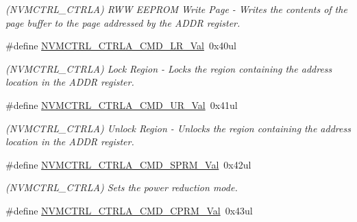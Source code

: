 \begin{DoxyCompactItemize}
\begin{DoxyCompactList}\small\item\em (N\+V\+M\+C\+T\+R\+L\+\_\+\+C\+T\+R\+L\+A) R\+W\+W E\+E\+P\+R\+O\+M Write Page -\/ Writes the contents of the page buffer to the page addressed by the A\+D\+D\+R register. \end{DoxyCompactList}\item 
\hypertarget{group___s_a_m_l21___n_v_m_c_t_r_l_ga30ddc4581bb1d3ba0a5dfebff3025ae6}{}\#define \hyperlink{group___s_a_m_l21___n_v_m_c_t_r_l_ga30ddc4581bb1d3ba0a5dfebff3025ae6}{N\+V\+M\+C\+T\+R\+L\+\_\+\+C\+T\+R\+L\+A\+\_\+\+C\+M\+D\+\_\+\+L\+R\+\_\+\+Val}~0x40ul\label{group___s_a_m_l21___n_v_m_c_t_r_l_ga30ddc4581bb1d3ba0a5dfebff3025ae6}

\begin{DoxyCompactList}\small\item\em (N\+V\+M\+C\+T\+R\+L\+\_\+\+C\+T\+R\+L\+A) Lock Region -\/ Locks the region containing the address location in the A\+D\+D\+R register. \end{DoxyCompactList}\item 
\hypertarget{group___s_a_m_l21___n_v_m_c_t_r_l_ga594434a1450c942a3a1b8938d7f8ee50}{}\#define \hyperlink{group___s_a_m_l21___n_v_m_c_t_r_l_ga594434a1450c942a3a1b8938d7f8ee50}{N\+V\+M\+C\+T\+R\+L\+\_\+\+C\+T\+R\+L\+A\+\_\+\+C\+M\+D\+\_\+\+U\+R\+\_\+\+Val}~0x41ul\label{group___s_a_m_l21___n_v_m_c_t_r_l_ga594434a1450c942a3a1b8938d7f8ee50}

\begin{DoxyCompactList}\small\item\em (N\+V\+M\+C\+T\+R\+L\+\_\+\+C\+T\+R\+L\+A) Unlock Region -\/ Unlocks the region containing the address location in the A\+D\+D\+R register. \end{DoxyCompactList}\item 
\hypertarget{group___s_a_m_l21___n_v_m_c_t_r_l_ga5e5184e115f92e2037793f468f07e912}{}\#define \hyperlink{group___s_a_m_l21___n_v_m_c_t_r_l_ga5e5184e115f92e2037793f468f07e912}{N\+V\+M\+C\+T\+R\+L\+\_\+\+C\+T\+R\+L\+A\+\_\+\+C\+M\+D\+\_\+\+S\+P\+R\+M\+\_\+\+Val}~0x42ul\label{group___s_a_m_l21___n_v_m_c_t_r_l_ga5e5184e115f92e2037793f468f07e912}

\begin{DoxyCompactList}\small\item\em (N\+V\+M\+C\+T\+R\+L\+\_\+\+C\+T\+R\+L\+A) Sets the power reduction mode. \end{DoxyCompactList}\item 
\hypertarget{group___s_a_m_l21___n_v_m_c_t_r_l_ga5af4406a70755e9869cbddf9aeccba45}{}\#define \hyperlink{group___s_a_m_l21___n_v_m_c_t_r_l_ga5af4406a70755e9869cbddf9aeccba45}{N\+V\+M\+C\+T\+R\+L\+\_\+\+C\+T\+R\+L\+A\+\_\+\+C\+M\+D\+\_\+\+C\+P\+R\+M\+\_\+\+Val}~0x43ul\label{group___s_a_m_l21___n_v_m_c_t_r_l_ga5af4406a70755e9869cbddf9aeccba45}


\end{DoxyCompactItemize}
